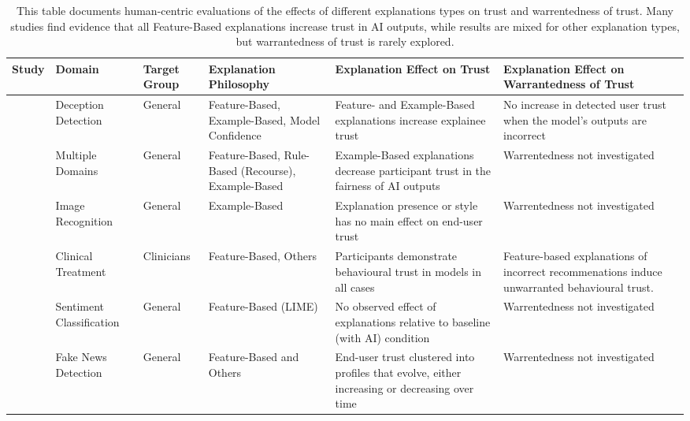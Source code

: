 \begin{table*}[tbp]
    \caption{This table documents human-centric evaluations of the effects of different explanations types on trust and warrentedness of trust. Many studies find evidence that all Feature-Based explanations increase trust in AI outputs, while results are mixed for other explanation types, but warrantedness of trust is rarely explored.}
    \begin{center}
    \begin{tabular}{p{1.5cm}p{1.5cm}p{1.5cm}p{2cm}p{3cm}p{3cm}}
        \toprule
        Study & Domain & Target Group & Explanation Philosophy & Explanation Effect on Trust & Explanation Effect on Warrantedness of Trust \\
        \midrule
        \textcite{Lai-and-Tan} & Deception Detection & General & Feature-Based, Example-Based, Model Confidence & Feature- and Example-Based explanations increase explainee trust & No increase in detected user trust when the model's outputs are incorrect \\
        \textcite{Binns-et-al} & Multiple Domains & General & Feature-Based, Rule-Based (Recourse), Example-Based & Example-Based explanations decrease participant trust in the fairness of AI outputs & Warrentedness not investigated \\
        \textcite{Ford-et-al} & Image Recognition & General & Example-Based & Explanation presence or style has no main effect on end-user trust & Warrentedness not investigated \\
        \textcite{Jacobs-et-al} & Clinical Treatment & Clinicians & Feature-Based, Others & Participants demonstrate behavioural trust in models in all cases & Feature-based explanations of incorrect recommenations induce unwarranted behavioural trust. \\
        \textcite{Bansal-et-al} & Sentiment Classification & General & Feature-Based (LIME) & No observed effect of explanations relative to baseline (with AI) condition & Warrentedness not investigated \\
        \textcite{Mohseni-et-al} & Fake News Detection & General & Feature-Based and Others & End-user trust clustered into profiles that evolve, either increasing or decreasing over time & Warrentedness not investigated \\
        \bottomrule
    \end{tabular}
    \label{tab:studies}
    \end{center}
\end{table*}

